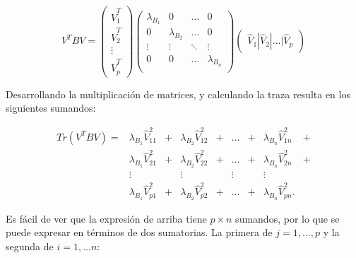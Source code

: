 \begin{equation*}
V^T B V = 
\left(\!
    \begin{array}{c}
      \widehat{V}_1^T\\
      \widehat{V}_2^T\\
      \vdots \\
      \widehat{V}_p^T
    \end{array}
  \!\right) 
  \left(\!
    \begin{array}{cccc}
      \lambda_{B_1} & 0 & \hdots & 0\\
      0 & \lambda_{B_2} & \hdots & 0\\
      \vdots &  \vdots &\ddots & \vdots\\
      0 & 0 & \hdots & \lambda_{B_n}\\
    \end{array}
  \!\right) 
  \left(\!\begin{array}{c}
      \widehat{V}_1 |
      \widehat{V}_2 |
      \hdots |
      \widehat{V}_p
    \end{array}
  \!\right) 
\end{equation*} 

Desarrollando la multiplicación de matrices, y calculando la traza resulta en los siguientes sumandos:
 
 \begin{equation*}
\begin{aligned}
      Tr(V^T B V) =& \lambda_{B_1} \widehat{V}_{11}^2&  +
                     & \lambda_{B_2} \widehat{V}_{12}^2& +
                     & \hdots& +
                     &\lambda_{B_n} \widehat{V}_{1n}^2& + \\
                     & \lambda_{B_1} \widehat{V}_{21}^2&+
                     & \lambda_{B_2} \widehat{V}_{22}^2& +
                     & \hdots& +
                     &\lambda_{B_n} \widehat{V}_{2n}^2& + \\
                     & \vdots&  
                     & \vdots& 
                     & \vdots& 
                     & \vdots& \\
                     & \lambda_{B_1} \widehat{V}_{p1}^2&+
                     & \lambda_{B_2} \widehat{V}_{p2}^2& +
                     & \hdots& + 
                     & \lambda_{B_n} \widehat{V}_{pn}^2.&  
 \end{aligned}
 \end{equation*}

 Es fácil de ver que la expresión de arriba tiene $p \times n$ sumandos, por lo que se puede expresar en términos de dos sumatorias. La primera de $j=1,...,p$ y la segunda de $i = 1,...n$:

